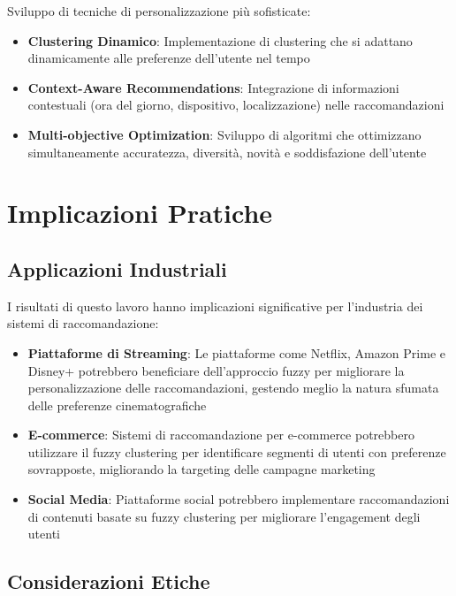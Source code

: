 Sviluppo di tecniche di personalizzazione più sofisticate:

\begin{itemize}
    \item \textbf{Clustering Dinamico}: Implementazione di clustering che si adattano dinamicamente alle preferenze dell'utente nel tempo
    
    \item \textbf{Context-Aware Recommendations}: Integrazione di informazioni contestuali (ora del giorno, dispositivo, localizzazione) nelle raccomandazioni
    
    \item \textbf{Multi-objective Optimization}: Sviluppo di algoritmi che ottimizzano simultaneamente accuratezza, diversità, novità e soddisfazione dell'utente
\end{itemize}

\section{Implicazioni Pratiche}

\subsection{Applicazioni Industriali}

I risultati di questo lavoro hanno implicazioni significative per l'industria dei sistemi di raccomandazione:

\begin{itemize}
    \item \textbf{Piattaforme di Streaming}: Le piattaforme come Netflix, Amazon Prime e Disney+ potrebbero beneficiare dell'approccio fuzzy per migliorare la personalizzazione delle raccomandazioni, gestendo meglio la natura sfumata delle preferenze cinematografiche
    
    \item \textbf{E-commerce}: Sistemi di raccomandazione per e-commerce potrebbero utilizzare il fuzzy clustering per identificare segmenti di utenti con preferenze sovrapposte, migliorando la targeting delle campagne marketing
    
    \item \textbf{Social Media}: Piattaforme social potrebbero implementare raccomandazioni di contenuti basate su fuzzy clustering per migliorare l'engagement degli utenti
\end{itemize}

\subsection{Considerazioni Etiche}

